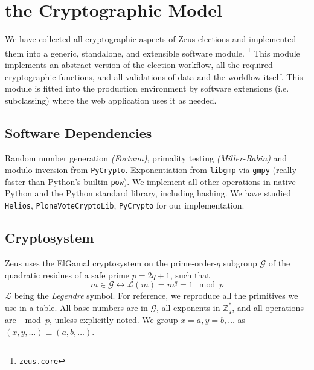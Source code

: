 \documentclass[runningheads,a4paper]{llncs}
\begin{document}

\section{the Cryptographic Model}

We have collected all cryptographic aspects of Zeus elections
and implemented them into a generic, standalone, and extensible software module.
\footnote{\texttt{zeus.core}}
This module implements an abstract version of the election workflow,
all the required cryptographic functions, and all validations of data
and the workflow itself.
This module is fitted into the production environment by software extensions
(i.e. subclassing) where the web application uses it as needed.

\subsection{Software Dependencies}
Random number generation \emph{(Fortuna)},
primality testing \emph{(Miller-Rabin)} and modulo inversion from
\texttt{PyCrypto}. Exponentiation from \texttt{libgmp} via \texttt{gmpy}
(really faster than Python's builtin \texttt{pow}).
We implement all other operations in native Python and
the Python standard library, including hashing.
We have studied \texttt{Helios}, \texttt{PloneVoteCryptoLib},
\texttt{PyCrypto} for our implementation.

\subsection{Cryptosystem}
Zeus uses the ElGamal cryptosystem on the prime-order-$q$ subgroup
$\mathcal{G}$ of the quadratic residues of a safe prime $p = 2q + 1$,
such that
$$m \in \mathcal{G} \longleftrightarrow \mathcal{L}(m) = m^q = 1 \mod p$$
$\mathcal{L}$ being the \emph{Legendre} symbol.
For reference, we reproduce all the primitives we use in a table.
All base numbers are in $\mathcal{G}$, all exponents in $\mathbb{Z}^{*}_q$,
and all operations are $\mod p$, unless explicitly noted.
We group $x=a, y=b, \ldots$ as $(x,y,\ldots)\equiv(a,b,\ldots)$.
\end{document}
